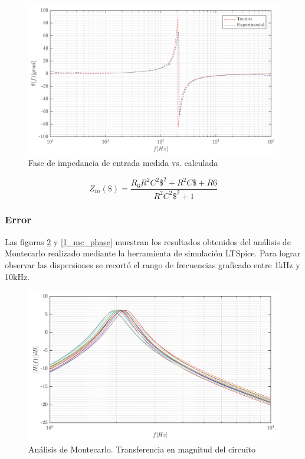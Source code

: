 \begin{figure}[H]
\centering
\includegraphics[scale=0.4]{resources/impedancia_entrada_phase}
\caption{Fase de impedancia de entrada medida vs. calculada}
\label{1_zin_phase}
\end{figure}

\begin{equation}
Z_{in}(\$) = \frac{R_6R^2C^2\$^2 + R^2C\$ + R6}{R^2C^2\$^2 + 1}
\label{1_zin_teo}
\end{equation}

\subsubsection{Error}

Las figuras \ref{1_mc_mag} y \ref{1_mc_phase} muestran los resultados obtenidos del análisis de Montecarlo realizado mediante la herramienta de simulación LTSpice. Para lograr observar las dispersiones se recortó el rango de frecuencias graficado entre 1kHz y 10kHz.

\begin{figure}[H]
\centering
\includegraphics[scale=0.4]{resources/montecarlo_mag}
\caption{Análisis de Montecarlo. Transferencia en magnitud del circuito}
\label{1_mc_mag}
\end{figure}

